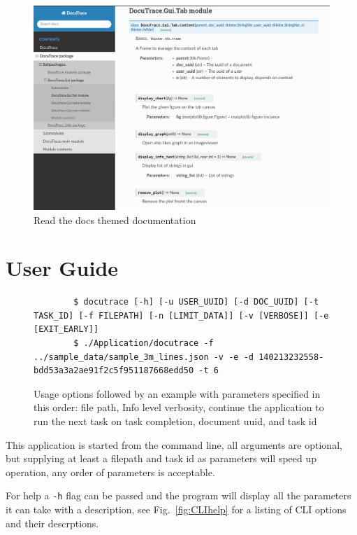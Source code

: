 \documentclass[11pt]{article}
\newcommand{\code}[1]{\colorbox{light-gray}{\texttt{#1}}}
\begin{document}
\begin{figure}[H]
    \centering
    \includegraphics[width=1\textwidth]{rtdDocs.png}
    \caption{Read the docs themed documentation}
    \label{fig:rtd}
\end{figure}


\newpage
\section{User Guide}

\begin{figure}[h]
    \begin{verbatim}
        $ docutrace [-h] [-u USER_UUID] [-d DOC_UUID] [-t TASK_ID] [-f FILEPATH] [-n [LIMIT_DATA]] [-v [VERBOSE]] [-e [EXIT_EARLY]]
        $ ./Application/docutrace -f ../sample_data/sample_3m_lines.json -v -e -d 140213232558-bdd53a3a2ae91f2c5f951187668edd50 -t 6
    \end{verbatim}
    \caption{Usage options followed by an example with parameters specified in this order: file path, Info level verbosity, continue the application to run the next task on task completion, document uuid, and task id}
    \label{fig:CLIOpts}
\end{figure}

This application is started from the command line, all arguments are optional, but supplying at least a filepath and task id as parameters will speed up operation, any order of parameters is acceptable. 

For help a \code{-h} flag can be passed and the program will display all the parameters it can take with a description, see Fig.~\ref{fig:CLIhelp} for a listing of CLI options and their descrptions.
\end{document}
